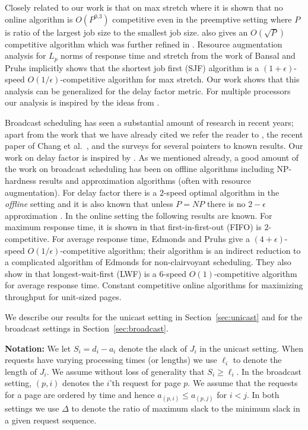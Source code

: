\documentclass[11pt]{article}
\newcommand{\etal}{et al.\ }
\newcommand{\eps}{\epsilon}
\begin{document}
Closely related to our work is that on max stretch \cite{BenderCM98}
where it is shown that no online algorithm is $O(P^{0.3})$ competitive
even in the preemptive setting where $P$ is ratio of the largest job
size to the smallest job size. \cite{BenderCM98} also gives an
$O(\sqrt{P})$ competitive algorithm which was further refined in
\cite{BenderMR02}. Resource augmentation analysis for $L_p$ norms of
response time and stretch from the work of Bansal and Pruhs
\cite{BansalP03} implicitly shows that the shortest job first (SJF)
algorithm is a $(1+\eps)$-speed $O(1/\eps)$-competitive algorithm for
max stretch. Our work shows that this analysis can be generalized for
the delay factor metric. For multiple processors our analysis is
inspired by the ideas from \cite{AvrahamiA03,ChekuriGKK04}.

Broadcast scheduling has seen a substantial amount of research in
recent years; apart from the work that we have already cited we refer
the reader to \cite{CharikarK06,KhullerK04}, the recent paper of Chang
\etal \cite{ChangEGK08}, and the surveys \cite{PruhsST,Pruhs07} for
several pointers to known results. Our work on delay factor is
inspired by \cite{ChangEGK08}.  As we mentioned already, a good
amount of the work on broadcast scheduling has been on offline
algorithms including NP-hardness results and approximation algorithms
(often with resource augmentation). For delay factor there is a
$2$-speed optimal algorithm in the {\em offline} setting and it is
also known that unless $P=NP$ there is no $2-\eps$ approximation
\cite{ChangEGK08}. In the online setting the following results are
known.  For maximum response time, it is shown in
\cite{BartalM00,ChangEGK08} that first-in-first-out (FIFO) is
$2$-competitive.  For average response time,
Edmonds and Pruhs \cite{EdmondsP03} give a $(4+\eps)$-speed
$O(1/\eps)$-competitive algorithm; their algorithm is an indirect
reduction to a complicated algorithm of Edmonds \cite{Edmonds00} for
non-clairvoyant scheduling. They also show in \cite{EdmondsP04} that
longest-wait-first (LWF) is a $6$-speed $O(1)$-competitive algorithm
for average response time.  Constant competitive online
algorithms for maximizing throughput
\cite{Kimc04,ChanLTW04,ZhengFCCPW06,ChrobakDJKK06} for unit-sized
pages.

\medskip
\noindent
We describe our results for the unicast setting
in Section~\ref{sec:unicast} and for the broadcast settings in
Section~\ref{sec:broadcast}.

\medskip
\noindent
{\bf Notation:}
We let $S_i = d_i - a_i$ denote the slack of $J_i$ in the unicast
setting. When requests have varying processing times (or lengths) we
use $\ell_i$ to denote the length of $J_i$. We assume without loss
of generality that $S_i \ge \ell_i$.
In the broadcast setting, $(p,i)$ denotes the $i$'th request for
page $p$. We assume that the requests for a page are ordered by time
and hence $a_{(p,i)} \le a_{(p,j)}$ for $i < j$.
In both settings we use $\Delta$ to denote the ratio of maximum slack
to the minimum slack in a given request sequence.
\end{document}
